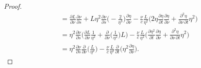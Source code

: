 \documentclass[10pt]{article}
\begin{document}
\begin{itemize}
\begin{proof}
\begin{align*}
        &= \frac{\partial L}{\partial \nu} \frac{\partial \nu}{\partial s}
        + L \eta^2 \frac{\partial \nu}{\partial s} \bigg( -\frac{2}{\eta^3} \bigg) \frac{\partial \eta}{\partial \nu} 
        - \frac{\nu}{c} \frac{L}{\eta^2} \bigg( 2\eta \frac{\partial \eta}{\partial t} \frac{\partial \eta}{\partial \nu} + \frac{\partial^2 \eta }{\partial \nu\, \partial t} \eta^2 \bigg)\\
        &= \eta^2 \frac{\partial \nu}{\partial s} \bigg( \frac{\partial L}{\partial \nu} \frac{1}{\eta^2}         
        + \frac{\partial }{\partial \nu} \bigg( \frac{1}{\eta^2} \bigg) L \bigg)
        - \frac{\nu}{c} \frac{L}{\eta^2} \bigg( \frac{\partial \eta^2}{\partial t} \frac{\partial \eta}{\partial \nu} + \frac{\partial^2 \eta }{\partial \nu\, \partial t} \eta^2 \bigg) \\
        &= \eta^2 \frac{\partial \nu}{\partial s} \frac{\partial }{\partial \nu} \bigg( \frac{L}{\eta^2} \bigg)
        - \frac{\nu}{c} \frac{L}{\eta^2} \frac{\partial }{\partial t} \bigg( \eta^2 \frac{\partial \eta}{\partial \nu} \bigg).
      \end{align*}
    \end{proof}


\end{itemize}
\end{document}
